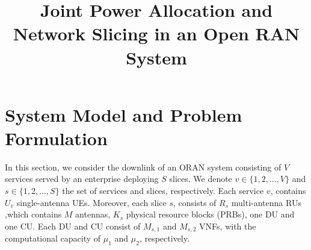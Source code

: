 \documentclass[conference]{IEEEtran}
\begin{document}
\title{Joint Power Allocation and Network Slicing in an Open RAN System \vspace{-.1cm}
}
%
  \author{
  }

\maketitle

\begin{abstract}

\end{abstract}

\begin{IEEEkeywords}

\end{IEEEkeywords}

\section{System Model and Problem Formulation}\label{systemmodel}
In this section, we consider the downlink of an ORAN system consisting of $V$ services served by an enterprise deploying $S$ slices. We denote $v\in \{1,2,...,V \} $ and $s \in \{1,2,...,S \}$ the set of
services and slices, respectively. Each service $v$, contains $U_v$ single-antenna UEs. Moreover, each slice $s$, consists of $R_s$ multi-antenna RUs ,which contains $M$ antennas, $K_s$ physical resource blocks (PRBs), one DU and one CU. Each DU and CU consist of $M_{s,1}$ and $M_{s,2}$ VNFs, with the computational capacity
of $\mu_1$ and $\mu_2$, respectively.
\end{document}
